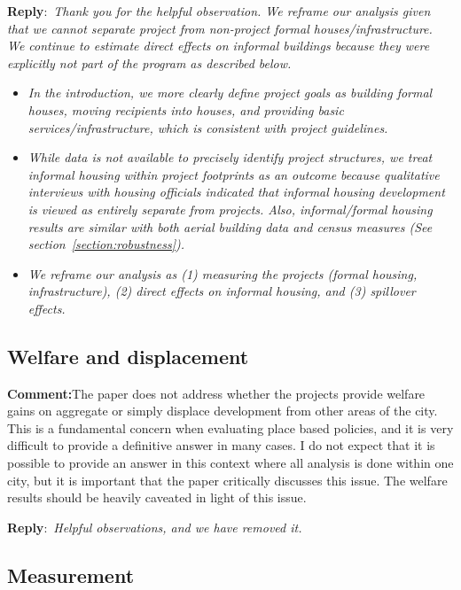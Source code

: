 \documentclass{article}
\newcommand{\reply}{\medskip \noindent \textbf{Reply}:\ \textit }
\newcommand{\sr}{\begin{minipage}{\dimexpr\textwidth-3cm}}
\newcommand{\er}{\end{minipage}}
\newcommand{\cc}{\medskip \noindent \textbf{Comment:}\hspace{2em}}
\begin{document}
\sr
\reply{Thank you for the helpful observation.  We reframe our analysis given that we cannot separate project from non-project formal houses/infrastructure.  We continue to estimate direct effects on informal buildings because they were explicitly not part of the program as described below. }
\begin{itemize}
    \item \textit{In the introduction, we more clearly define project goals as building formal houses, moving recipients into houses, and providing basic services/infrastructure, which is consistent with project guidelines.}
    \item \textit{While data is not available to precisely identify project structures, we treat informal housing within project footprints as an outcome because qualitative interviews with housing officials indicated that informal housing development is viewed as entirely separate from projects. Also, informal/formal housing results are similar with both aerial building data and census measures (See section~\ref{section:robustness}). }
    \item \textit{We reframe our analysis as (1) measuring the projects (formal housing, infrastructure), (2) direct effects on informal housing, and (3) spillover effects.}
\end{itemize}
\er


\subsection{Welfare and displacement}

\cc The paper does not address whether the projects provide welfare gains on aggregate or simply displace development from other areas of the city. This is a fundamental concern when evaluating place based policies, and it is very difficult to provide a definitive answer in many cases. I do not expect that it is possible to provide an answer in this context where all analysis is done within one city, but it is important that the paper critically discusses this issue. The welfare results should be heavily caveated in light of this issue.

\sr
\reply{Helpful observations, and we have removed it.}\\
\er


\subsection{Measurement}
\end{document}
